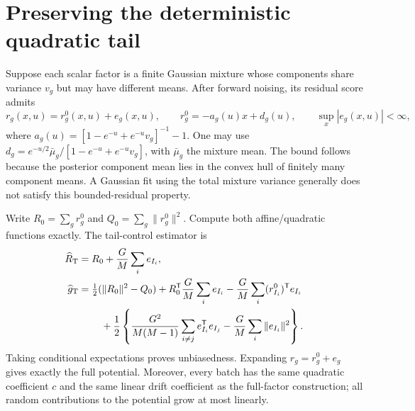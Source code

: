 \documentclass{article}
\begin{document}
\section{Preserving the deterministic quadratic tail}
Suppose each scalar factor is a finite Gaussian mixture whose components share variance $v_g$ but may have different means. After forward noising, its residual score admits
\begin{equation}\label{eq:tail-decomposition}
 r_g(x,u)=r_g^0(x,u)+e_g(x,u),\qquad
 r_g^0=-a_g(u)x+d_g(u),\qquad \sup_x|e_g(x,u)|<\infty,
\end{equation}
where $a_g(u)=[1-e^{-u}+e^{-u}v_g]^{-1}-1$. One may use $d_g=e^{-u/2}\bar\mu_g/[1-e^{-u}+e^{-u}v_g]$, with $\bar\mu_g$ the mixture mean. The bound follows because the posterior component mean lies in the convex hull of finitely many component means. A Gaussian fit using the total mixture variance generally does not satisfy this bounded-residual property.

Write $R_0=\sum_g r_g^0$ and $Q_0=\sum_g\|r_g^0\|^2$. Compute both affine/quadratic functions exactly. The tail-control estimator is
\begin{align}\label{eq:tail-estimator}
 \widehat R_{\mathrm T}&=R_0+\frac GM\sum_i e_{I_i},\\
 \widehat g_{\mathrm T}&=\tfrac12(\|R_0\|^2-Q_0)
 +R_0^{\mathsf T}\frac GM\sum_i e_{I_i}
 -\frac GM\sum_i(r_{I_i}^0)^{\mathsf T}e_{I_i}\nonumber\\
 &\hspace{8mm}+\frac12\left\{\frac{G^2}{M(M-1)}\sum_{i\ne j}e_{I_i}^{\mathsf T}e_{I_j}-\frac GM\sum_i\|e_{I_i}\|^2\right\}.\nonumber
\end{align}
Taking conditional expectations proves unbiasedness. Expanding $r_g=r_g^0+e_g$ gives exactly the full potential. Moreover, every batch has the same quadratic coefficient $c$ and the same linear drift coefficient as the full-factor construction; all random contributions to the potential grow at most linearly.
\end{document}
